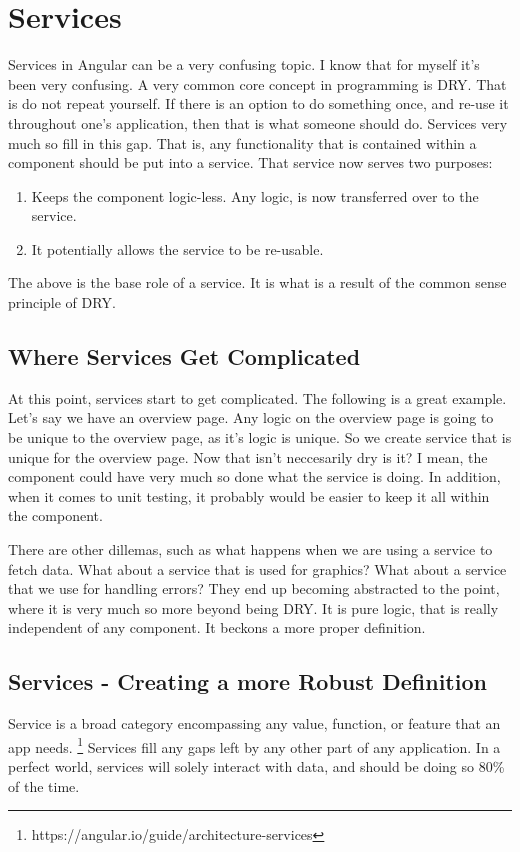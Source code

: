\section{ Services }
\maketitle{}

Services in Angular can be a very confusing topic. I know that for myself it's
been very confusing. A very common core concept in programming is DRY. That is
do not repeat yourself. If there is an option to do something once, and re-use
it throughout one's application, then that is what someone should do. Services
very much so fill in this gap. That is, any functionality that is contained
within a component should be put into a service. That service now serves two
purposes:
\begin{enumerate}
  \item Keeps the component logic-less. Any logic, is now transferred over to
  the service.
  \item It potentially allows the service to be re-usable.
\end{enumerate}

The above is the base role of a service. It is what is a result of the common
sense principle of DRY.

\subsection{ Where Services Get Complicated }
At this point, services start to get complicated. The following is a great
example. Let's say we have an overview page. Any logic on the overview page is
going to be unique to the overview page, as it's logic is unique. So we create
service that is unique for the overview page. Now that isn't neccesarily dry is
it? I mean, the component could have very much so done what the service is doing.
In addition, when it comes to unit testing, it probably would be easier to keep
it all within the component.

There are other dillemas, such as what happens when we are using a service to
fetch data. What about a service that is used for graphics? What about a
service that we use for handling errors? They end up becoming abstracted to the
point, where it is very much so more beyond being DRY. It is pure logic, that
is really independent of any component. It beckons a more proper definition.

\subsection{ Services - Creating a more Robust Definition }
Service is a broad category encompassing any value, function,
or feature that an app needs. \footnote{https://angular.io/guide/architecture-services}
Services fill any gaps left by any other part of any application. In a perfect
world, services will solely interact with data, and should be doing so 80\% of
the time.

